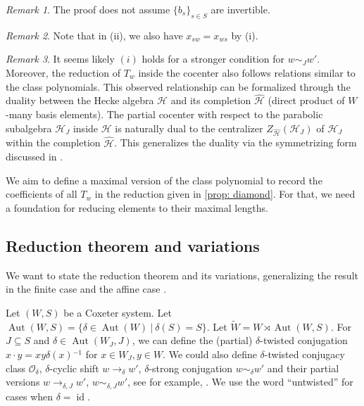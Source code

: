 \documentclass[a4paper, reqno, 14pt]{amsart}
\def\i{{^{-1}}}
\def\subset{\subseteq}
\def\co{\mathcal{O}}
\def\ch{\mathcal{H}}
\DeclareMathOperator{\Aut}{Aut}
\DeclareMathOperator{\id}{id}
\theoremstyle{definition}
\theoremstyle{remark}
\newtheorem*{rmk}{Remark}
\numberwithin{equation}{section}
\numberwithin{thm}{section}
\begin{document}
    \begin{rmk}
        The proof does not assume $\{b_s\}_{s\in S}$ are invertible. 
    \end{rmk}
    \begin{rmk}
        Note that in (ii), we also have $x_{sw}=x_{ws}$ by (i).
    \end{rmk}
    \begin{rmk}
        It seems likely $(i)$ holds for a stronger condition for $w\sim_J w'$. Moreover, the reduction of $T_w$ inside the cocenter also follows relations similar to the class polynomials. This observed relationship can be formalized through the duality between the Hecke algebra $\ch$ and its completion $\widehat{\ch}$ (direct product of $W$-many basis elements). The partial cocenter with respect to the parabolic subalgebra $\ch_J$ inside $\ch$ is naturally dual to the centralizer $Z_{\widehat{\ch}}(\ch_J)$ of $\ch_J$ within the completion $\widehat{\ch}$. This generalizes the duality via the symmetrizing form discussed in \cite{geck1997centers}.
    \end{rmk}

    We aim to define a maximal version of the class polynomial to record the coefficients of all $T_w$ in the reduction given in \cref{prop: diamond}. For that, we need a foundation for reducing elements to their maximal lengths. 
    
    \subsection{Reduction theorem and variations}
        We want to state the reduction theorem and its variations, generalizing the result in the finite case \cite{geck1993irreducible} and the affine case \cite{he2014minimal}.

        Let $(W,S)$ be a Coxeter system. Let $\Aut(W,S)=\{\delta\in \Aut(W)\ |\ \delta(S)=S\}$. Let $\tilde{W}=W\rtimes \Aut(W,S)$. For $J\subset S$ and $\delta\in \Aut(W_J,J)$, we can define the (partial) $\delta$-twisted conjugation $x\cdot y=xy\delta(x)\i$ for $x\in W_J,y\in W$. We could also define $\delta$-twisted conjugacy class $\co_\delta$, $\delta$-cyclic shift $w\rightarrow_\delta w'$, $\delta$-strong conjugation $w\sim_\delta w'$ and their partial versions $w\rightarrow_{\delta,J} w'$, $w\sim_{\delta,J} w'$, see for example, \cite[\S 3.1]{he2007minimal}. We use the word ``untwisted'' for cases when $\delta=\id$.
        
\end{document}
